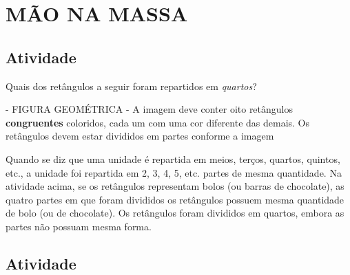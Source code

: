 \documentclass[a4,12pt]{book}
\begin{document}
\section{ MÃO NA MASSA }


\subsection{Atividade}







Quais dos retângulos a seguir foram repartidos em {\it quartos}?

\begin{imagem*}[breakable]{}{}   - FIGURA GEOMÉTRICA - A imagem deve conter oito retângulos   {\bf congruentes}   coloridos, cada um com uma cor diferente das demais. Os retângulos devem estar divididos em partes conforme a imagem   
  
\end{imagem*}













\begin{refletindo*}[breakable]{}{}  
  Quando se diz que uma unidade é repartida em meios, terços, quartos, quintos, etc., a unidade foi repartida em 2, 3, 4, 5, etc. partes de mesma quantidade.  
  Na atividade acima, se os retângulos representam bolos (ou barras de chocolate), as quatro partes em que foram divididos os retângulos possuem mesma quantidade de bolo (ou de chocolate).  
  Os retângulos foram divididos em quartos, embora as partes não possuam mesma forma.  
\end{refletindo*}


\subsection{Atividade}
\end{document}
